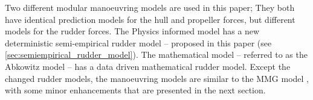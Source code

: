 Two different modular manoeuvring models are used in this paper; They both have identical prediction models for the hull and propeller forces, but different models for the rudder forces. The Physics informed model has a new deterministic semi-empirical rudder model -- proposed in this paper (see \autoref{sec:semiempirical_rudder_model}). The mathematical model -- referred to as the Abkowitz model -- has a data driven mathematical rudder model. 
Except the changed rudder models, the manoeuvring models are similar to the MMG model \citep{yasukawa_introduction_2015}, with some minor enhancements that are presented in the next section.